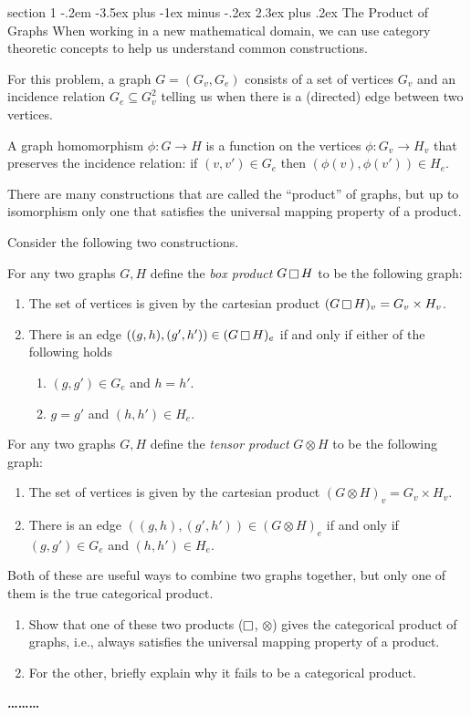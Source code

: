 \documentclass[12pt]{article}
\makeatletter
\newenvironment{problem}{\@startsection
       {section}
       {1}
       {-.2em}
       {-3.5ex plus -1ex minus -.2ex}
       {2.3ex plus .2ex}
       {\pagebreak[3]%
       \large\bf\noindent{Problem }
       }
       }
       {%
       \begin{center}\large\bf \ldots\ldots\ldots\end{center}}
\makeatother
\begin{document}
\begin{problem}{The Product of Graphs}
  When working in a new mathematical domain, we can use category
  theoretic concepts to help us understand common constructions.

  For this problem, a graph $G = (G_v, G_e)$ consists of a set of
  vertices $G_v$ and an incidence relation $G_e \subseteq G_v^2$
  telling us when there is a (directed) edge between two vertices.

  A graph homomorphism $\phi : G \to H$ is a function on the vertices
  $\phi : G_v \to H_v$ that preserves the incidence relation: if
  $(v,v')\in G_e$ then $(\phi(v), \phi(v')) \in H_e$.

  There are many constructions that are called the ``product'' of
  graphs, but up to isomorphism only one that satisfies the universal
  mapping property of a product.

  Consider the following two constructions.

  For any two graphs $G, H$ define the \emph{box product} $G \mathop{\square}
  H$ to be the following graph:
  \begin{enumerate}
  \item The set of vertices is given by the cartesian product
    $(G\mathop{\square} H)_v = G_v \times H_v$.
  \item There is an edge $((g,h), (g',h')) \in (G\mathop{\square} H)_e$ if and
    only if either of the following holds
    \begin{enumerate}
    \item $(g,g') \in G_e$ and $h = h'$.
    \item $g = g'$ and $(h,h') \in H_e$.
    \end{enumerate}
  \end{enumerate}

  For any two graphs $G,H$ define the \emph{tensor product} $G\otimes
  H$ to be the following graph:
  \begin{enumerate}
  \item The set of vertices is given by the cartesian product
    $(G\otimes H)_v = G_v \times H_v$.
  \item There is an edge $((g,h), (g',h')) \in (G\otimes H)_e$ if and
    only if $(g,g') \in G_e$ and $(h,h') \in H_e$.
  \end{enumerate}

  Both of these are useful ways to combine two graphs together, but
  only one of them is the true categorical product.
  \begin{enumerate}
  \item Show that one of these two products ($\mathop{\square}$, $\otimes$)
    gives the categorical product of graphs, i.e., always satisfies
    the universal mapping property of a product.
  \item For the other, briefly explain why it fails to be a
    categorical product.
  \end{enumerate}
\end{problem}
\end{document}
